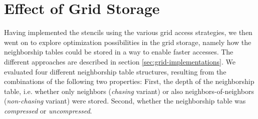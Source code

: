 \section{Effect of Grid Storage} \label{sec:res-storage}

Having implemented the stencils using the various grid access strategies, we then went on to explore optimization possibilities in the grid storage, namely how the neighborship tables could be stored in a way to enable faster accesses. The different approaches are described in section \ref{sec:grid-implementations}. We evaluated four different neighborship table structures, resulting from the combinations of the following two properties: First, the depth of the neighborship table, i.e. whether only neighbors (\emph{chasing} variant) or also neighbors-of-neighbors (\emph{non-chasing} variant) were stored. Second, whether the neighborship table was \emph{compressed} or \emph{uncompressed}.


